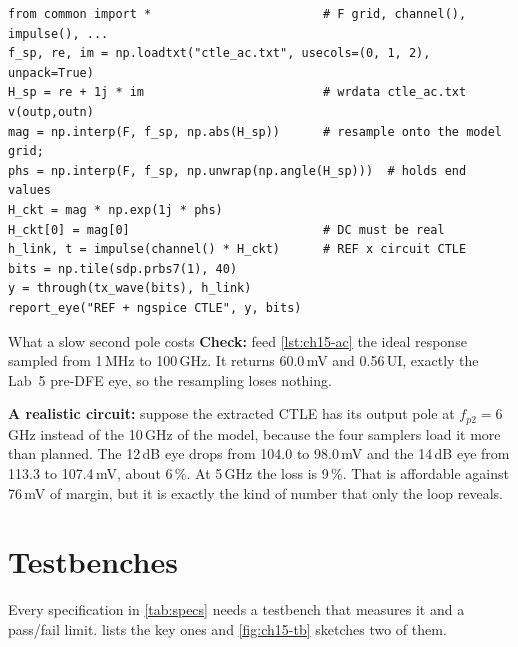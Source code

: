 \begin{lstlisting}[caption={Back-annotating a circuit CTLE (tested with a synthetic \code{wrdata} file).},label={lst:ch15-ac},captionpos=b]
from common import *                        # F grid, channel(), impulse(), ...
f_sp, re, im = np.loadtxt("ctle_ac.txt", usecols=(0, 1, 2), unpack=True)
H_sp = re + 1j * im                         # wrdata ctle_ac.txt v(outp,outn)
mag = np.interp(F, f_sp, np.abs(H_sp))      # resample onto the model grid;
phs = np.interp(F, f_sp, np.unwrap(np.angle(H_sp)))  # holds end values
H_ckt = mag * np.exp(1j * phs)
H_ckt[0] = mag[0]                           # DC must be real
h_link, t = impulse(channel() * H_ckt)      # REF x circuit CTLE
bits = np.tile(sdp.prbs7(1), 40)
y = through(tx_wave(bits), h_link)
report_eye("REF + ngspice CTLE", y, bits)
\end{lstlisting}

\begin{example}{What a slow second pole costs}\label{we:ch15-pole}
\textbf{Check:} feed \cref{lst:ch15-ac} the ideal  response sampled from 1\,MHz to 100\,GHz. It returns 60.0\,mV and 0.56\,UI, exactly the Lab~5 pre-DFE eye, so the resampling loses nothing.

\textbf{A realistic circuit:} suppose the extracted CTLE has its output pole at $f_{p2}=6$\,GHz instead of the 10\,GHz of the model, because the four samplers load it more than planned. The 12\,dB eye drops from 104.0 to 98.0\,mV and the 14\,dB eye from 113.3 to 107.4\,mV, about 6\,\%. At 5\,GHz the loss is 9\,\%. That is affordable against 76\,mV of margin, but it is exactly the kind of number that only the loop reveals.
\end{example}

\section{Testbenches}\label{sec:testbenches}

Every specification in \cref{tab:specs} needs a testbench that measures it and a pass/fail limit.  lists the key ones and \cref{fig:ch15-tb} sketches two of them.

